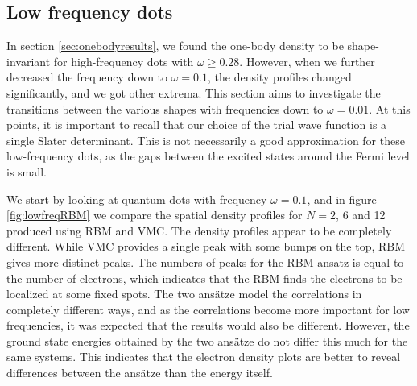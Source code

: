 \subsection{Low frequency dots} \label{sec:lowfrequencies}
In section \ref{sec:onebodyresults}, we found the one-body density to be shape-invariant for high-frequency dots with $\omega\geq0.28$. However, when we further decreased the frequency down to $\omega=0.1$, the density profiles changed significantly, and we got other extrema. This section aims to investigate the transitions between the various shapes with frequencies down to $\omega=0.01$. At this points, it is important to recall that our choice of the trial wave function is a single Slater determinant. This is not necessarily a good approximation for these low-frequency dots, as the gaps between the excited states around the Fermi level is small. 

We start by looking at quantum dots with frequency $\omega=0.1$, and in figure \eqref{fig:lowfreqRBM} we compare the spatial density profiles for $N=2$, 6 and 12 produced using RBM and VMC. The density profiles appear to be completely different. While VMC provides a single peak with some bumps on the top, RBM gives more distinct peaks. The numbers of peaks for the RBM ansatz is equal to the number of electrons, which indicates that the RBM finds the electrons to be localized at some fixed spots. The two ansätze model the correlations in completely different ways, and as the correlations become more important for low frequencies, it was expected that the results would also be different. However, the ground state energies obtained by the two ansätze do not differ this much for the same systems. This indicates that the electron density plots are better to reveal differences between the ansätze than the energy itself. 

